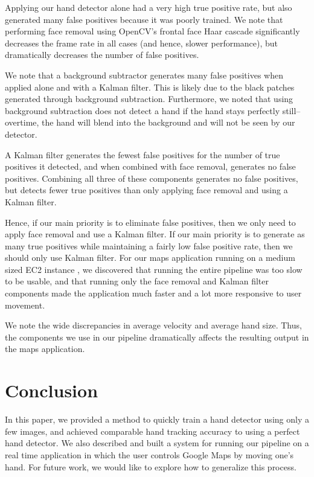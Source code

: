 \documentclass[12pt]{article}
\begin{document}
Applying our hand detector alone had a very high true positive rate, but also generated many false positives because it was poorly trained. We note that performing face removal using OpenCV's frontal face Haar cascade significantly decreases the frame rate in all cases (and hence, slower performance), but dramatically decreases the number of false positives. 

We note that a background subtractor generates many false positives when applied alone and with a Kalman filter. This is likely due to the black patches generated through background subtraction. Furthermore, we noted that using background subtraction does not detect a hand if the hand stays perfectly still--overtime, the hand will blend into the background and will not be seen by our detector. 

A Kalman filter generates the fewest false positives for the number of true positives it detected, and when combined with face removal, generates no false positives. Combining all three of these components generates no false positives, but detects fewer true positives than only applying face removal and using a Kalman filter. 

Hence, if our main priority is to eliminate false positives, then we only need to apply face removal and use a Kalman filter. If our main priority is to generate as many true positives while maintaining a fairly low false positive rate, then we should only use Kalman filter. For our maps application running on a medium sized EC2 instance \cite{ec2}, we discovered that running the entire pipeline was too slow to be usable, and that running only the face removal and Kalman filter components made the application much faster and a lot more responsive to user movement.

We note the wide discrepancies in average velocity and average hand size. Thus, the components we use in our pipeline dramatically affects the resulting output in the maps application.


\section{Conclusion}

In this paper, we provided a method to quickly train a hand detector using only a few images, and achieved comparable hand tracking accuracy to using a perfect hand detector. We also described and built a system for running our pipeline on a real time application in which the user controls Google Maps by moving one's hand. For future work, we would like to explore how to generalize this process. 
\end{document}
